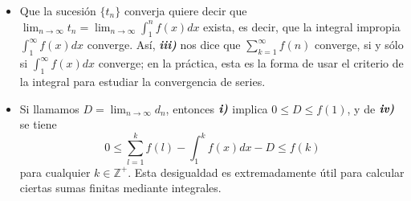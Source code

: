 \begin{remark}
  \begin{itemize}
    \item[\tiny{\ding{110}}] Que la sucesión $\lbrace{t_n\rbrace}$ converja quiere decir que $\lim_{n\to\infty}t_n=\lim_{n\to\infty}\int_1^{n}f(x)dx$ exista, es decir, que la integral impropia $\int_1^{\infty}f(x)dx$ converge. Así, \textit{\textbf{iii)}} nos dice que $\sum_{k=1}^{\infty}f(n)$ converge, si y sólo si $\int_1^{\infty}f(x)dx$ converge; en la práctica, esta es la forma de usar el criterio de la integral para estudiar la convergencia de series.
    \item[\tiny{\ding{110}}] Si llamamos $D=\lim_{n\to\infty}d_n$, entonces $\textit{\textbf{i)}}$ implica $0\leq D\leq f(1)$, y de $\textit{\textbf{iv)}}$ se tiene
    \begin{equation*}
      0\leq\sum_{l=1}^k f(l)-\int_1^{k}f(x)dx-D\leq f(k)
    \end{equation*}
    para cualquier $k\in\mathbb{Z}^+$. Esta desigualdad es extremadamente útil para calcular ciertas sumas finitas mediante integrales.
  \end{itemize}
\end{remark}
